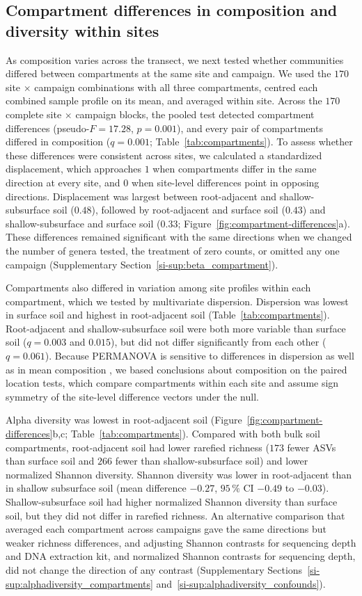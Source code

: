 \documentclass[fleqn,10pt,numbers]{olplainarticle}
\begin{document}
\subsection*{Compartment differences in composition and diversity within sites}
As composition varies across the transect, we next tested whether communities differed between compartments at the same site and campaign. We used the $170$ site $\times$ campaign combinations with all three compartments, centred each combined sample profile on its mean, and averaged within site. Across the $170$ complete site $\times$ campaign blocks, the pooled test detected compartment differences (pseudo-$F=17.28$, $p=0.001$), and every pair of compartments differed in composition ($q=0.001$; Table~\ref{tab:compartments}). To assess whether these differences were consistent across sites, we calculated a standardized displacement, which approaches $1$ when compartments differ in the same direction at every site, and $0$ when site-level differences point in opposing directions. Displacement was largest between root-adjacent and shallow-subsurface soil ($0.48$), followed by root-adjacent and surface soil ($0.43$) and shallow-subsurface and surface soil ($0.33$; Figure~\ref{fig:compartment-differences}a). These differences remained significant with the same directions when we changed the number of genera tested, the treatment of zero counts, or omitted any one campaign (Supplementary Section~\ref{si-sup:beta_compartment}).

Compartments also differed in variation among site profiles within each compartment, which we tested by multivariate dispersion. Dispersion was lowest in surface soil and highest in root-adjacent soil (Table~\ref{tab:compartments}). Root-adjacent and shallow-subsurface soil were both more variable than surface soil ($q=0.003$ and $0.015$), but did not differ significantly from each other ($q=0.061$). Because PERMANOVA is sensitive to differences in dispersion as well as in mean composition \cite{anderson2006multivariate}, we based conclusions about composition on the paired location tests, which compare compartments within each site and assume sign symmetry of the site-level difference vectors under the null.

Alpha diversity was lowest in root-adjacent soil (Figure~\ref{fig:compartment-differences}b,c; Table~\ref{tab:compartments}). Compared with both bulk soil compartments, root-adjacent soil had lower rarefied richness ($173$ fewer ASVs than surface soil and $266$ fewer than shallow-subsurface soil) and lower normalized Shannon diversity. Shannon diversity was lower in root-adjacent than in shallow subsurface soil (mean difference $-0.27$, $95\,\%$ CI $-0.49$ to $-0.03$). Shallow-subsurface soil had higher normalized Shannon diversity than surface soil, but they did not differ in rarefied richness. An alternative comparison that averaged each compartment across campaigns gave the same directions but weaker richness differences, and adjusting Shannon contrasts for sequencing depth and DNA extraction kit, and normalized Shannon contrasts for sequencing depth, did not change the direction of any contrast (Supplementary Sections~\ref{si-sup:alphadiversity_compartments} and~\ref{si-sup:alphadiversity_confounds}).
\end{document}
